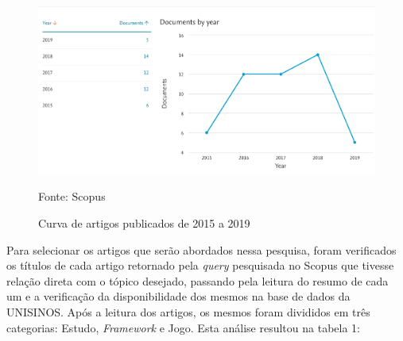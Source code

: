 \documentclass[twoside,english,brazilian]{UNISINOSartigo}
\begin{document}

\begin{figure}[!htbp]
	\caption{Curva de artigos publicados de 2015 a 2019}
	\label{fig:imagens/pubByYear.png}
	\centering%
		\includegraphics[width=\textwidth]{imagens/pubByYear.png}
	\begin{center}
        Fonte: Scopus
    \end{center}
\end{figure}

Para selecionar os artigos que ser\~{a}o abordados nessa pesquisa, foram verificados os t\'{i}tulos de cada artigo retornado pela \textit{query} pesquisada no Scopus que tivesse rela\c{c}\~{a}o direta com o t\'{o}pico desejado, passando pela leitura do resumo de cada um e a verifica\c{c}\~{a}o da disponibilidade dos mesmos na base de dados da UNISINOS. Após a leitura dos artigos, os mesmos foram divididos em três categorias: Estudo, \textit{Framework} e Jogo. Esta an\'{a}lise resultou na tabela 1:

\newpage
\end{document}
